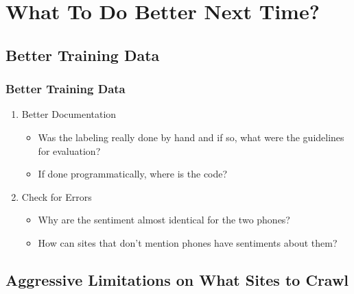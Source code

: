 \documentclass[10pt]{beamer}
\begin{document}
\section{What To Do Better Next Time?}



\subsection{Better Training Data}

\begin{frame}
\frametitle{Better Training Data}

\begin{enumerate}
    \item Better Documentation
    \begin{itemize}
        \item Was the labeling really done by hand and if so, what were
        the guidelines for evaluation?
        \pause
        \item If done programmatically, where is the code?
    \end{itemize}
    \pause
    \item Check for Errors
    \begin{itemize}
        \item Why are the sentiment almost identical for the two phones?
        \pause
        \item How can sites that don't mention phones have sentiments about them?
    \end{itemize}
\end{enumerate}

\end{frame}

\subsection{Aggressive Limitations on What Sites to Crawl}
\end{document}
